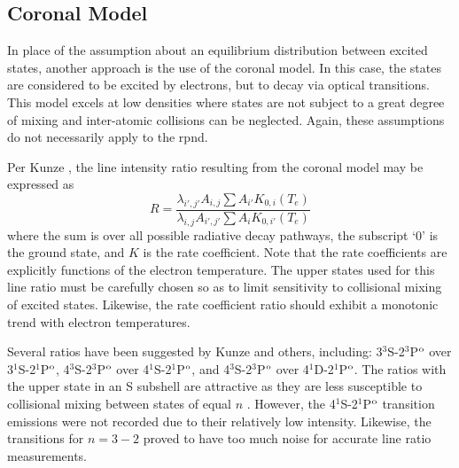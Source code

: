 \subsection{Coronal Model}

In place of the assumption about an equilibrium distribution between excited
states, another approach is the use of the coronal model. In this case, the
states are considered to be excited by electrons, but to decay via optical
transitions. This model excels at low densities where states are not subject to
a great degree of mixing and inter-atomic collisions can be neglected. Again,
these assumptions do not necessarily apply to the \acs{rpnd}.

Per Kunze \cite{Kunze2009}, the line intensity ratio resulting from the coronal
model may be expressed as
\begin{equation}
  R = \frac{\lambda_{i',j'}A_{i,j}\sum A_{i'} K_{0,i}(T_e)}
  {\lambda_{i,j}A_{i',j'}\sum A_{i} K_{0,i'}(T_e)}
\end{equation}
where the sum is over all possible radiative decay pathways, the subscript `0'
is the ground state, and $K$ is the rate coefficient. Note that the rate
coefficients are explicitly functions of the electron temperature. The upper
states used for this line ratio must be carefully chosen so as to limit
sensitivity to collisional mixing of excited states. Likewise, the rate
coefficient ratio should exhibit a monotonic trend with electron temperatures.

Several ratios have been suggested by Kunze and others, including:
3$^3$S-2$^3$P$^\mathrm{o}$ over 3$^1$S-2$^1$P$^\mathrm{o}$, 4$^3$S-2$^3$P$^\mathrm{o}$ over
4$^1$S-2$^1$P$^\mathrm{o}$, and 4$^3$S-2$^3$P$^\mathrm{o}$ over 4$^1$D-2$^1$P$^\mathrm{o}$. The
ratios with the upper state in an S subshell are attractive as they are less
susceptible to collisional mixing between states of equal $n$ \cite{Kunze2009}.
However, the 4$^1$S-2$^1$P$^\mathrm{o}$ transition emissions were not recorded due to
their relatively low intensity. Likewise, the transitions for $n=3-2$ proved to
have too much noise for accurate line ratio measurements.

